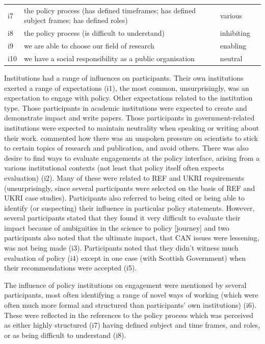 \begin{table}[!ht]
\begin{tabular}{L{.06\linewidth}L{.3\linewidth}L{.12\linewidth}L{.52\linewidth}}
i7 & the policy process (has defined timeframes; has defined subject frames; has defined roles) & various &  \\[5mm]
i8 & the policy process (is difficult to understand) & inhibiting &  \\[5mm]
i9 & we are able to choose our field of research & enabling & \\[5mm]
i10 & we have a social responsibility as a public organisation & neutral & \\[5mm] \hline
\end{tabular}
\end{table}



Institutions had a range of influences on participants. Their own institutions exerted a range of expectations (i1), the most common, unsurprisingly, was an expectation to engage with policy. Other expectations related to the institution type. Those participants in academic institutions were expected to create and demonstrate impact and write papers. Those participants in government-related institutions were expected to maintain neutrality when speaking or writing about their work.  commented how there was an unspoken pressure on scientists to stick to certain topics of research and publication, and avoid others. There was also desire to find ways to evaluate engagements at the policy interface, arising from a various institutional contexts (not least that policy itself often expects evaluation) (i2). Many of these were related to REF and UKRI requirements (unsurprisingly, since several participants were selected on the basis of REF and UKRI case studies). Participants also referred to being cited or being able to identify (or suspecting) their influence in particular policy statements. However, several participants stated that they found it very difficult to evaluate their impact because of ambiguities in the science to policy [journey] and two participants also noted that the ultimate impact, that CAN issues were lessening, was not being made (i3). Participants noted that they didn't witness much evaluation of policy (i4) except in one case (with Scottish Government) when their recommendations were accepted (i5).

The influence of policy institutions on engagement were mentioned by several participants, most often identifying a range of novel ways of working (which were often much more formal and structured than participants' own institutions) (i6). These were reflected in the references to the policy process which was perceived as either highly structured (i7) having defined subject and time frames, and roles, or as being difficult to understand (i8).

